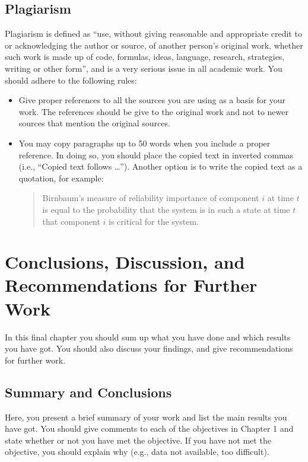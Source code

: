 \documentclass[12pt]{report}
\begin{document}
\section{Plagiarism}
Plagiarism is defined as ``use, without giving reasonable and appropriate credit to or acknowledging the author or source, of another person's original work, whether such work is made up of code, formulas, ideas, language, research, strategies, writing or other form'', and is a very serious issue in all academic work. You should adhere to the following rules:
\begin{itemize}
\item Give proper references to all the sources you are using as a basis for your work. The references should be give to the original work and not to newer sources that mention the original sources.
\item You may copy paragraphs up to 50 words when you include a proper reference. In doing so, you should place the copied text in inverted commas (i.e., ``Copied text follows \ldots''). Another option is to write the copied text as a quotation, for example:
\begin{quote}
Birnbaum's measure of reliability importance of component $i$ at time $t$ is equal to the probability that the system is in such a state at time $t$ that component $i$ is critical for the system.\newline \mbox{} \hfill \citet{rausand04}
\end{quote}
\end{itemize}




\chapter[Conclusions]{Conclusions, Discussion, and Recommendations for Further Work}
In this final chapter you should sum up what you have done and which results you have got. You should also discuss your findings, and give recommendations for further work.

\section{Summary and Conclusions}
Here, you present a brief summary of your work and list the main results you have got. You should give comments to each of the objectives in Chapter 1 and state whether or not you have met the objective. If you have not met the objective, you should explain why (e.g., data not available, too difficult).
\end{document}
